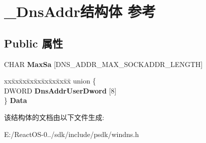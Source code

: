 \hypertarget{struct___dns_addr}{}\section{\+\_\+\+Dns\+Addr结构体 参考}
\label{struct___dns_addr}
\subsection*{Public 属性}
\begin{DoxyCompactItemize}
\item 
\mbox{\label{struct___dns_addr_a1f2db4153bca1003dcab4002d7b8a28c}} 
C\+H\+AR {\bfseries Max\+Sa} \mbox{[}D\+N\+S\+\_\+\+A\+D\+D\+R\+\_\+\+M\+A\+X\+\_\+\+S\+O\+C\+K\+A\+D\+D\+R\+\_\+\+L\+E\+N\+G\+TH\mbox{]}
\item 
\mbox{\label{struct___dns_addr_aaa0a1b497260776aec080a4fc2b42b47}} 
\begin{tabbing}
xx\=xx\=xx\=xx\=xx\=xx\=xx\=xx\=xx\=\kill
union \{\\
\>DWORD {\bfseries DnsAddrUserDword} \mbox{[}8\mbox{]}\\
\} {\bfseries Data}\\

\end{tabbing}\end{DoxyCompactItemize}


该结构体的文档由以下文件生成\+:\begin{DoxyCompactItemize}
\item 
E\+:/\+React\+O\+S-\/0../sdk/include/psdk/windns.\+h\end{DoxyCompactItemize}
